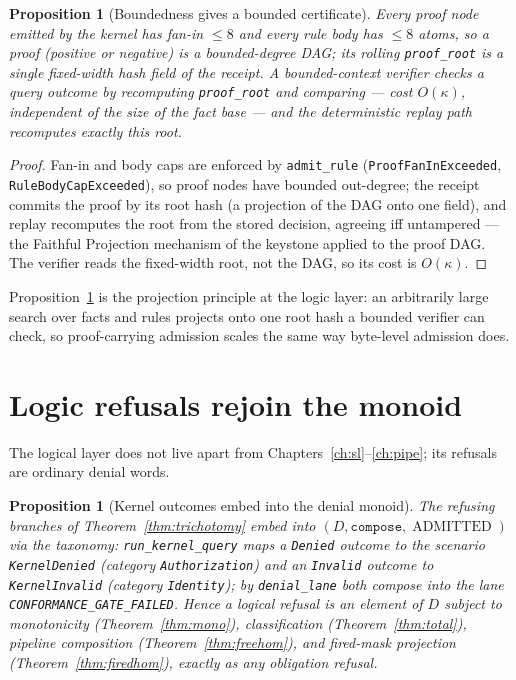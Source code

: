 \documentclass[11pt,oneside]{book}
\theoremstyle{definition}
\theoremstyle{plain}
\newtheorem{proposition}[theorem]{Proposition}
\theoremstyle{remark}
\newcommand{\CL}{\kappa}                       %
\newcommand{\code}[1]{\texttt{#1}}
\newcommand{\Deny}{D}                 %
\newcommand{\Adml}{\operatorname{ADMITTED}}          %
\begin{document}
\begin{proposition}[Boundedness gives a bounded certificate]\label{prop:boundedcert}
Every proof node emitted by the kernel has fan-in $\le 8$ and every rule body has $\le 8$ atoms, so a proof (positive or negative) is a bounded-degree DAG; its rolling \code{proof\_root} is a single fixed-width hash field of the receipt. %
A bounded-context verifier checks a query outcome by recomputing \code{proof\_root} and comparing --- cost $O(\CL)$, independent of the size of the fact base --- and the deterministic replay path recomputes exactly this root. %
\end{proposition}

\begin{proof}
Fan-in and body caps are enforced by \code{admit\_rule} (\code{ProofFanInExceeded}, \code{RuleBodyCapExceeded}), so proof nodes have bounded out-degree; the receipt commits the proof by its root hash (a projection of the DAG onto one field), and replay recomputes the root from the stored decision, agreeing iff untampered --- the Faithful Projection mechanism of the keystone applied to the proof DAG. %
The verifier reads the fixed-width root, not the DAG, so its cost is $O(\CL)$. %
\end{proof}

Proposition~\ref{prop:boundedcert} is the projection principle at the logic layer: an arbitrarily large search over facts and rules projects onto one root hash a bounded verifier can check, so proof-carrying admission scales the same way byte-level admission does. %

\section{Logic refusals rejoin the monoid}

The logical layer does not live apart from Chapters~\ref{ch:sl}--\ref{ch:pipe}; its refusals are ordinary denial words. %

\begin{proposition}[Kernel outcomes embed into the denial monoid]\label{prop:embed}
The refusing branches of Theorem~\ref{thm:trichotomy} embed into $(\Deny,\code{compose},\Adml)$ via the taxonomy: \code{run\_kernel\_query} maps a \code{Denied} outcome to the scenario \code{KernelDenied} (category \code{Authorization}) and an \code{Invalid} outcome to \code{KernelInvalid} (category \code{Identity}); by \code{denial\_lane} both compose into the lane \code{CONFORMANCE\_GATE\_FAILED}. %
Hence a logical refusal is an element of $\Deny$ subject to monotonicity (Theorem~\ref{thm:mono}), classification (Theorem~\ref{thm:total}), pipeline composition (Theorem~\ref{thm:freehom}), and fired-mask projection (Theorem~\ref{thm:firedhom}), exactly as any obligation refusal. %
\end{proposition}
\end{document}
